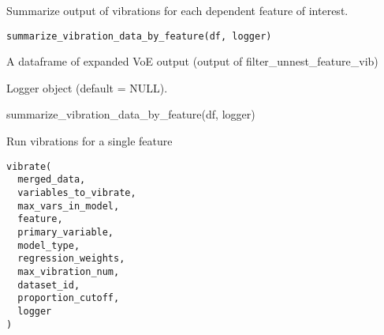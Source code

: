 \documentclass[a4paper]{book}
\begin{document}
%
\begin{Description}\relax
Summarize output of vibrations for each dependent feature of interest.
\end{Description}
%
\begin{Usage}
\begin{verbatim}
summarize_vibration_data_by_feature(df, logger)
\end{verbatim}
\end{Usage}
%
\begin{Arguments}
\begin{ldescription}
\item[\code{df}] A dataframe of expanded VoE output (output of filter\_unnest\_feature\_vib)

\item[\code{logger}] Logger object (default = NULL).
\end{ldescription}
\end{Arguments}
%
\begin{Examples}
\begin{ExampleCode}
summarize_vibration_data_by_feature(df, logger)
\end{ExampleCode}
\end{Examples}
%
\begin{Description}\relax
Run vibrations for a single feature
\end{Description}
%
\begin{Usage}
\begin{verbatim}
vibrate(
  merged_data,
  variables_to_vibrate,
  max_vars_in_model,
  feature,
  primary_variable,
  model_type,
  regression_weights,
  max_vibration_num,
  dataset_id,
  proportion_cutoff,
  logger
)
\end{verbatim}
\end{Usage}
%
\end{document}
